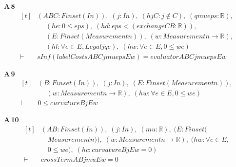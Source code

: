 \noindent\textbf{A\,8}\quad{}
{\footnotesize\[ \begin{aligned}[t]
&(\mathit{A} \mathit{B} \mathit{C} : \mathit{Finset} (\mathit{I} \mathit{n})),\; (\mathit{j} : \mathit{I} \mathit{n}),\; (\mathit{hjC} : \mathit{j} \notin \mathit{C}),\; (\mathit{q} \mathit{mu} \mathit{eps} : \mathbb{R} ),\\
&\quad \; (\mathit{he} : 0 \leq \mathit{eps}),\; (\mathit{hd} : \mathit{eps} < (\mathit{exchange} \mathit{C} \mathit{B} : \mathbb{R} )),\\
&\quad \; (\mathit{E} : \mathit{Finset} (\mathit{Measurement} \mathit{n})),\; (\mathit{w} : \mathit{Measurement} \mathit{n} \to \mathbb{R} ),\\
&\quad \; (\mathit{hl} : \forall \mathit{e} \in \mathit{E},\mathit{Legal} \mathit{j} \mathit{q} \mathit{e}),\; (\mathit{hw} : \forall \mathit{e} \in \mathit{E},0 \leq \mathit{w} \mathit{e})\\
\vdash\;&\mathit{sInf} (\mathit{labelCosts} \mathit{A} \mathit{B} \mathit{C} \mathit{j} \mathit{mu} \mathit{eps} \mathit{E} \mathit{w})=\mathit{evaluator} \mathit{A} \mathit{B} \mathit{C} \mathit{j} \mathit{mu} \mathit{eps} \mathit{E} \mathit{w}
\end{aligned} \]}

\noindent\textbf{A\,9}\quad{}
{\footnotesize\[ \begin{aligned}[t]
&(\mathit{B} : \mathit{Finset} (\mathit{I} \mathit{n})),\; (\mathit{j} : \mathit{I} \mathit{n}),\; (\mathit{E} : \mathit{Finset} (\mathit{Measurement} \mathit{n})),\\
&\quad \; (\mathit{w} : \mathit{Measurement} \mathit{n} \to \mathbb{R} ),\; (\mathit{hw} : \forall \mathit{e} \in \mathit{E},0 \leq \mathit{w} \mathit{e})\\
\vdash\;&0 \leq \mathit{curvature} \mathit{B} \mathit{j} \mathit{E} \mathit{w}
\end{aligned} \]}

\noindent\textbf{A\,10}\quad{}
{\footnotesize\[ \begin{aligned}[t]
&(\mathit{A} \mathit{B} : \mathit{Finset} (\mathit{I} \mathit{n})),\; (\mathit{j} : \mathit{I} \mathit{n}),\; (\mathit{mu} : \mathbb{R} ),\; (\mathit{E} : \mathit{Finset} (\\
&\quad \mathit{Measurement} \mathit{n})),\; (\mathit{w} : \mathit{Measurement} \mathit{n} \to \mathbb{R} ),\; (\mathit{hw} : \forall \mathit{e} \in \mathit{E},\\
&\quad 0 \leq \mathit{w} \mathit{e}),\; (\mathit{hc} : \mathit{curvature} \mathit{B} \mathit{j} \mathit{E} \mathit{w}=0)\\
\vdash\;&\mathit{crossTerm} \mathit{A} \mathit{B} \mathit{j} \mathit{mu} \mathit{E} \mathit{w}=0
\end{aligned} \]}

